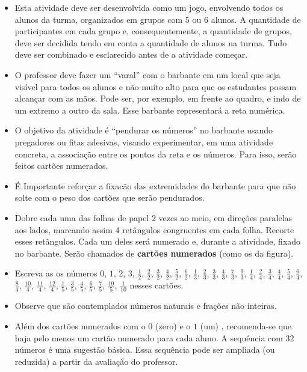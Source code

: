 \begin{multicols}{2}
\begin{itemize} %
  \item     Esta atividade deve ser desenvolvida como um jogo, envolvendo todos os alunos da turma, organizados em grupos com 5 ou 6 alunos. A quantidade de participantes em cada grupo e, consequentemente, a quantidade de grupos, deve ser decidida tendo em conta a quantidade de alunos na turma. Tudo deve ser combinado e esclarecido antes de a atividade começar.
  \item     O professor deve fazer um  ``varal'' com o barbante em um local que seja visível para todos os alunos e não muito alto para que os estudantes possam alcançar com as mãos. Pode ser, por exemplo, em frente ao quadro, e indo de um extremo a outro da sala. Esse barbante representará a reta numérica. 
  \item O objetivo da atividade é ``pendurar os números'' no barbante usando pregadores ou fitas adesivas, visando experimentar, em uma atividade concreta, a associação entre os pontos da reta e os números. Para isso, serão feitos cartões numerados. 
  \item É Importante reforçar a fixacão das extremidades do barbante para que não solte com o peso dos cartões que serão pendurados.
  \item Dobre cada uma das folhas de papel $2$ vezes ao meio, em direções paralelas aos lados, marcando assim 4 retângulos congruentes em cada folha. Recorte esses retângulos. Cada um deles será numerado e, durante a atividade, fixado no barbante. Serão chamados de {\bf cartões numerados} (como os da figura). 
  \item  Escreva as os números $0$, $1$, $2$, $3$, $\frac{1}{2}$, $\frac{2}{2}$, $\frac{3}{2}$, $\frac{4}{2}$, $\frac{5}{2}$, $\frac{6}{2}$, $\frac{1}{3}$, $\frac{2}{3}$, $\frac{3}{3}$, $\frac{4}{3}$, $\frac{7}{3}$, $\frac{9}{3}$, $\frac{1}{4}$, $\frac{2}{4}$, $\frac{3}{4}$, $\frac{4}{4}$, $\frac{5}{4}$, $\frac{6}{4}$, $\frac{8}{4}$, $\frac{10}{4}$, $\frac{11}{4}$, $\frac{12}{4}$, $\frac{1}{5}$, $\frac{3}{5}$, $\frac{4}{5}$, $\frac{6}{5}$, $\frac{7}{5}$, $\frac{10}{5}$, $\frac{1}{10}$ nesses cartões.
  \item Observe que são contemplados números naturais e frações não inteiras. 
  \item Além dos cartões numerados com o $0$ (zero) e o $1$ (um) , recomenda-se que haja pelo menos um cartão numerado para cada aluno. A sequência com $32$ números é uma sugestão básica. Essa sequência pode ser ampliada (ou reduzida) a partir da avaliação do professor. 
\end{itemize} %


\end{multicols}
